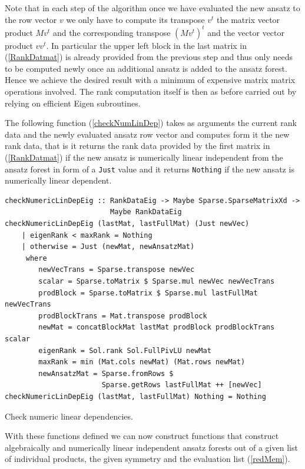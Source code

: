 \documentclass[a4paper,12pt, DIV=14, BCOR=5mm, twoside, headsepline, numbers=noenddot]{scrbook}
\begin{document}
Note that in each step of the algorithm once we have evaluated the new ansatz to the row vector $v$ we only have to compute its transpose $v^t$ the matrix vector product $Mv^t$ and the corresponding transpose $(Mv^t)^t$ and the vector vector product $v v^t$. In particular the upper left block in the last matrix in (\ref{RankDatmat}) is already provided from the previous step and thus only needs to be computed newly once an additional ansatz is added to the ansatz forest. Hence we achieve the desired result with a minimum of expensive matrix matrix operations involved. The rank computation itself is then as before carried out by relying on efficient Eigen subroutines.

The following function (\ref{checkNumLinDep}) takes as arguments the current rank data and the newly evaluated ansatz row vector and computes form it the new rank data, that is it returns the rank data provided by the first matrix in (\ref{RankDatmat}) if the new ansatz is numerically linear independent from the ansatz forest in form of a \texttt{Just} value and it returns \texttt{Nothing} if the new ansatz is numerically linear dependent. 

\begin{listing}[hbt!]
\begin{verbatim}
checkNumericLinDepEig :: RankDataEig -> Maybe Sparse.SparseMatrixXd ->
                         Maybe RankDataEig
checkNumericLinDepEig (lastMat, lastFullMat) (Just newVec)
    | eigenRank < maxRank = Nothing
    | otherwise = Just (newMat, newAnsatzMat)
     where
        newVecTrans = Sparse.transpose newVec
        scalar = Sparse.toMatrix $ Sparse.mul newVec newVecTrans
        prodBlock = Sparse.toMatrix $ Sparse.mul lastFullMat newVecTrans
        prodBlockTrans = Mat.transpose prodBlock
        newMat = concatBlockMat lastMat prodBlock prodBlockTrans scalar
        eigenRank = Sol.rank Sol.FullPivLU newMat
        maxRank = min (Mat.cols newMat) (Mat.rows newMat)
        newAnsatzMat = Sparse.fromRows $ 
                       Sparse.getRows lastFullMat ++ [newVec]
checkNumericLinDepEig (lastMat, lastFullMat) Nothing = Nothing
\end{verbatim} 
\caption{Check numeric linear dependencies.}\label{checkNumLinDep}
\end{listing}

With these functions defined we can now construct functions that construct algebraically and numerically linear independent ansatz forests out of a given list of individual products, the given symmetry and the evaluation list (\ref{redMem}).
\end{document}
